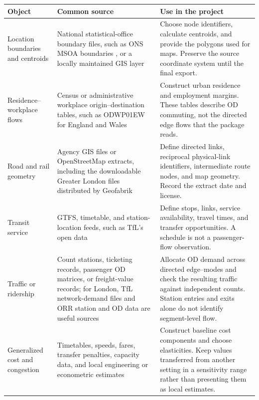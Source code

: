 \begin{longtable}{L{0.21\textwidth}L{0.30\textwidth}L{0.41\textwidth}}
\toprule
Object & Common source & Use in the project \\
\midrule
\endhead
Location boundaries and centroids &
National statistical-office boundary files, such as ONS MSOA boundaries
\citep{ONS2021MSOABoundaries}, or a locally maintained GIS layer &
Choose node identifiers, calculate centroids, and provide the polygons used
for maps. Preserve the source coordinate system until the final export. \\
Residence--workplace flows &
Census or administrative workplace origin--destination tables, such as
ODWP01EW for England and Wales \citep{ONS2021WorkplaceFlows} &
Construct urban residence and employment margins. These tables describe OD
commuting, not the directed edge flows that the package reads. \\
Road and rail geometry &
Agency GIS files or OpenStreetMap extracts, including the downloadable
Greater London files distributed by Geofabrik
\citep{GeofabrikGreaterLondon} &
Define directed links, reciprocal physical-link identifiers, intermediate
route nodes, and map geometry. Record the extract date and license. \\
Transit service &
GTFS, timetable, and station-location feeds, such as TfL's open data
\citep{TfLOpenData} &
Define stops, links, service availability, travel times, and transfer
opportunities. A schedule is not a passenger-flow observation. \\
Traffic or ridership &
Count stations, ticketing records, passenger OD matrices, or freight-value
records; for London, TfL network-demand files and ORR station and OD data are
useful sources \citep{TfLNetworkDemand,ORRStationUsage2024} &
Allocate OD demand across directed edge--modes and check the resulting traffic
against independent counts. Station entries and exits alone do not identify
segment-level flow. \\
Generalized cost and congestion &
Timetables, speeds, fares, transfer penalties, capacity data, and local
engineering or econometric estimates &
Construct baseline cost components and choose elasticities. Keep values
transferred from another setting in a sensitivity range rather than presenting
them as local estimates. \\
\bottomrule
\end{longtable}

